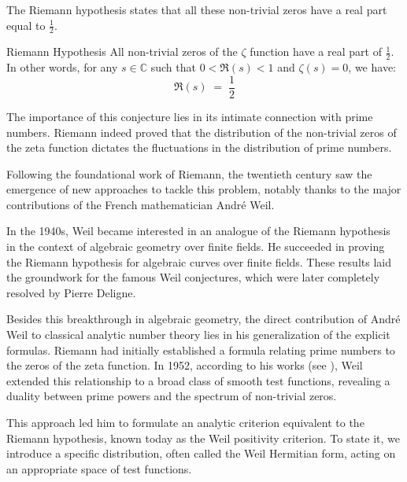 \documentclass[Riemann_Hypothesis.tex]{subfiles}
\begin{document}
The Riemann hypothesis states that all these non-trivial zeros 
have a real part equal to $\frac{1}{2}$.

\begin{theoremEn}[label=th:HypotheseRiemann_en]{Riemann Hypothesis}
    All non-trivial zeros of the $\zeta$ function have a real part of $\frac{1}{2}$. In other words, for any $s \in \mathbb{C}$ such that $0 < \Re(s) < 1$ and $\zeta(s) = 0$, we have:
    \begin{equation*}
        \Re(s) \;=\; \frac{1}{2}
    \end{equation*}
\end{theoremEn}

The importance of this conjecture lies in its intimate connection with prime numbers. 
Riemann indeed proved that the distribution of the non-trivial zeros of the zeta function 
dictates the fluctuations in the distribution of prime numbers.

Following the foundational work of Riemann, the twentieth century saw 
the emergence of new approaches to tackle this problem, notably thanks to the 
major contributions of the French mathematician André Weil. 

In the 1940s, Weil became interested in an analogue of the Riemann hypothesis in 
the context of algebraic geometry over finite fields. He succeeded in proving 
the Riemann hypothesis for algebraic curves over finite fields. These results 
laid the groundwork for the famous Weil conjectures, which were later completely 
resolved by Pierre Deligne.

Besides this breakthrough in algebraic geometry, 
the direct contribution of André Weil 
to classical analytic number theory lies in his generalization of the explicit 
formulas. Riemann had initially established a formula relating prime numbers 
to the zeros of the zeta function. In 1952, according to his 
works (see \cite{weil1952_formules_en}), Weil extended 
this relationship to a broad class of smooth test functions, 
revealing a duality between prime powers 
and the spectrum of non-trivial zeros.

This approach led him to formulate an analytic criterion equivalent 
to the Riemann hypothesis, known today as the Weil 
positivity criterion. To state it, we introduce a specific distribution, 
often called the Weil Hermitian form, acting on an appropriate space of 
test functions.
\end{document}
